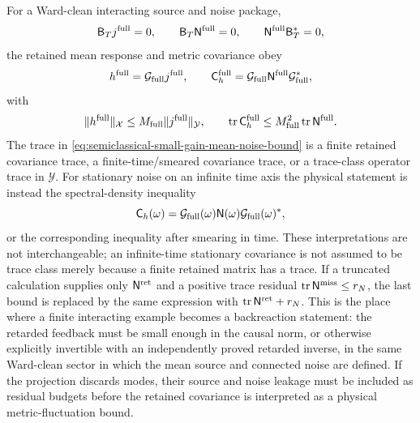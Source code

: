 \begin{controlledapproximation}
For a Ward-clean interacting source and noise package,
\[
  \mathsf B_T j^{\rm full}=0,\qquad
  \mathsf B_T\mathsf N^{\rm full}=0,\qquad
  \mathsf N^{\rm full}\mathsf B_T^*=0,
\]
the retained mean response and metric covariance obey
\begin{equation}
  h^{\rm full}
  =
  \mathcal G_{\rm full}j^{\rm full},
  \qquad
  \mathsf C_h^{\rm full}
  =
  \mathcal G_{\rm full}
  \mathsf N^{\rm full}
  \mathcal G_{\rm full}^{*},
  \label{eq:semiclassical-small-gain-response-covariance}
\end{equation}
with
\begin{equation}
  \lVert h^{\rm full}\rVert_{\mathcal X}
  \le
  M_{\rm full}\lVert j^{\rm full}\rVert_{\mathcal Y},
  \qquad
  \operatorname{tr}\mathsf C_h^{\rm full}
  \le
  M_{\rm full}^2
  \operatorname{tr}\mathsf N^{\rm full}.
  \label{eq:semiclassical-small-gain-mean-noise-bound}
\end{equation}
The trace in \eqref{eq:semiclassical-small-gain-mean-noise-bound} is a finite
retained covariance trace, a finite-time/smeared covariance trace, or a
trace-class operator trace in \(\mathcal Y\).  For stationary noise on an
infinite time axis the physical statement is instead the spectral-density
inequality
\[
  \mathsf C_h(\omega)
  =
  \mathcal G_{\rm full}(\omega)
  \mathsf N(\omega)
  \mathcal G_{\rm full}(\omega)^*,
\]
or the corresponding inequality after smearing in time.  These interpretations
are not interchangeable; an infinite-time stationary covariance is not assumed
to be trace class merely because a finite retained matrix has a trace.
If a truncated calculation supplies only
\(\mathsf N^{\rm ret}\) and a positive trace residual
\(\operatorname{tr}\mathsf N^{\rm miss}\le r_N\), the last bound is replaced
by the same expression with
\(\operatorname{tr}\mathsf N^{\rm ret}+r_N\).  This is the place where a
finite interacting example becomes a backreaction statement: the retarded
feedback must be small enough in the causal norm, or otherwise explicitly
invertible with an independently proved retarded inverse, in the same
Ward-clean sector in which the mean source and connected noise are defined.
If the projection discards modes, their source and noise leakage must be
included as residual budgets before the retained covariance is interpreted as a
physical metric-fluctuation bound.


\end{controlledapproximation}
